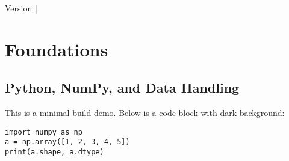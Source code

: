 \documentclass[12pt,a4paper]{book}
\begin{document}
\frontmatter
\begin{titlepage}
  \centering
  {\Huge \textbf{\BookTitle}\par}
  \vspace{6pt}
  {\Large \BookSubtitle\par}
  \vspace{18pt}
  {\Large \BookAuthor\par}
  \vfill
  {\small Version \BookVersion \quad|\quad \RepoLink \par}
\end{titlepage}

\tableofcontents
\mainmatter

\part{Foundations}
\chapter{Python, NumPy, and Data Handling}

This is a minimal build demo. Below is a code block with dark background:

\begin{lstlisting}
import numpy as np
a = np.array([1, 2, 3, 4, 5])
print(a.shape, a.dtype)
\end{lstlisting}
\end{document}
